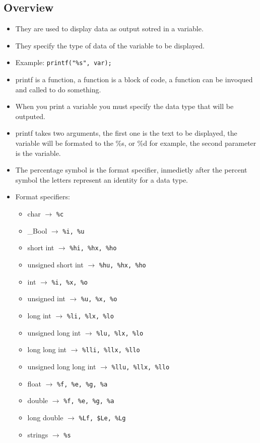 \subsection{Overview}
\begin{itemize}
    \item They are used to display data as output sotred in a variable.
    \item They specify the type of data of the variable to be displayed.
    \item Example: \verb|printf("%s", var);|
    \item printf is a function, a function is a block of code, a function can be invoqued and called to do something.
    \item When you print a variable you must specify the data type that will be outputed.
    \item printf takes two arguments, the first one is the text to be displayed, the variable will be formated to the \%s, or \%d for example, the second parameter is the variable.
    \item The percentage symbol is the format specifier, inmedietly after the percent symbol the letters represent an identity for a data type.
    \item Format specifiers:
        \begin{itemize}
            \item char $\rightarrow$ \verb|%c|
            \item \_Bool $\rightarrow$ \verb|%i, %u|
            \item short int $\rightarrow$ \verb|%hi, %hx, %ho|
            \item unsigned short int $\rightarrow$ \verb|%hu, %hx, %ho|
            \item int $\rightarrow$ \verb|%i, %x, %o|
            \item unsigned int $\rightarrow$ \verb|%u, %x, %o|
            \item long int $\rightarrow$ \verb|%li, %lx, %lo|
            \item unsigned long int $\rightarrow$ \verb|%lu, %lx, %lo|
            \item long long int $\rightarrow$ \verb|%lli, %llx, %llo|
            \item unsigned long long int $\rightarrow$ \verb|%llu, %llx, %llo|
            \item float $\rightarrow$ \verb|%f, %e, %g, %a|
            \item double $\rightarrow$ \verb|%f, %e, %g, %a|
            \item long double $\rightarrow$ \verb|%Lf, $Le, %Lg|
            \item strings $\rightarrow$ \verb|%s|
        \end{itemize}
    

\end{itemize}
